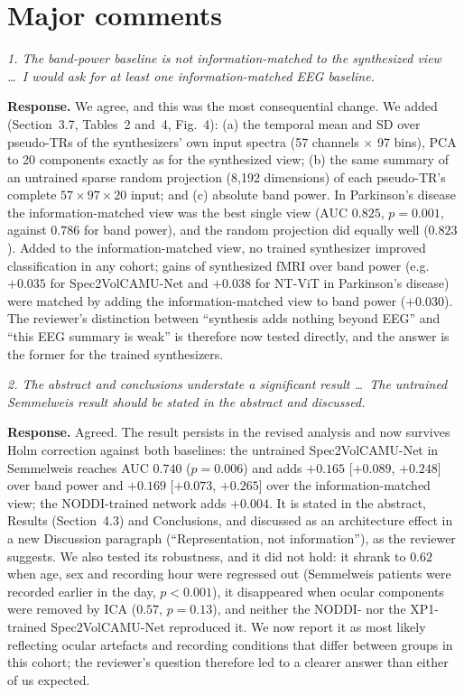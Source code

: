 \documentclass[11pt]{article}
\newcommand{\rc}[1]{\par\medskip\noindent\textit{#1}\par\smallskip}
\newcommand{\resp}{\noindent\textbf{Response.} }
\begin{document}
\section*{Major comments}

\rc{1. The band-power baseline is not information-matched to the synthesized view \ldots\ I would ask for at least one information-matched EEG baseline.}
\resp We agree, and this was the most consequential change. We added (Section~3.7, Tables~2 and~4, Fig.~4): (a) the temporal mean and SD over pseudo-TRs of the synthesizers' own input spectra (57 channels $\times$ 97 bins), PCA to 20 components exactly as for the synthesized view; (b) the same summary of an untrained sparse random projection (8,192 dimensions) of each pseudo-TR's complete $57\times97\times20$ input; and (c) absolute band power. In Parkinson's disease the information-matched view was the best single view (AUC $0.825$, $p=0.001$, against $0.786$ for band power), and the random projection did equally well ($0.823$). Added to the information-matched view, no trained synthesizer improved classification in any cohort; gains of synthesized fMRI over band power (e.g.\ $+0.035$ for Spec2VolCAMU-Net and $+0.038$ for NT-ViT in Parkinson's disease) were matched by adding the information-matched view to band power ($+0.030$). The reviewer's distinction between ``synthesis adds nothing beyond EEG'' and ``this EEG summary is weak'' is therefore now tested directly, and the answer is the former for the trained synthesizers.

\rc{2. The abstract and conclusions understate a significant result \ldots\ The untrained Semmelweis result should be stated in the abstract and discussed.}
\resp Agreed. The result persists in the revised analysis and now survives Holm correction against both baselines: the untrained Spec2VolCAMU-Net in Semmelweis reaches AUC $0.740$ ($p=0.006$) and adds $+0.165$ [$+0.089$, $+0.248$] over band power and $+0.169$ [$+0.073$, $+0.265$] over the information-matched view; the NODDI-trained network adds $+0.004$. It is stated in the abstract, Results (Section~4.3) and Conclusions, and discussed as an architecture effect in a new Discussion paragraph (``Representation, not information''), as the reviewer suggests. We also tested its robustness, and it did not hold: it shrank to $0.62$ when age, sex and recording hour were regressed out (Semmelweis patients were recorded earlier in the day, $p<0.001$), it disappeared when ocular components were removed by ICA ($0.57$, $p=0.13$), and neither the NODDI- nor the XP1-trained Spec2VolCAMU-Net reproduced it. We now report it as most likely reflecting ocular artefacts and recording conditions that differ between groups in this cohort; the reviewer's question therefore led to a clearer answer than either of us expected.
\end{document}
